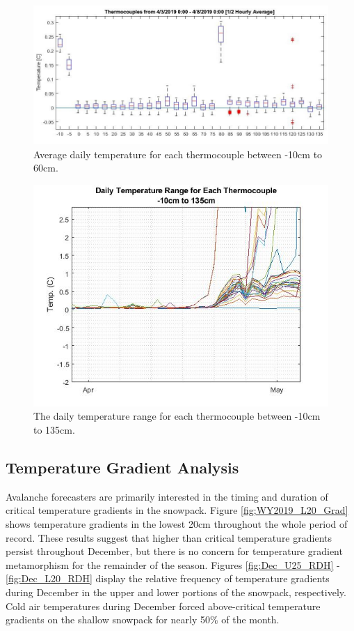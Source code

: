 \begin{figure}[H]
    \raggedleft
    \includegraphics[width=1\linewidth]{figures/Isotherm_boxplot.jpg}
    \caption{Average daily temperature for each thermocouple between -10cm to 60cm.}
    \label{fig:IsothermBoxplot}
 \end{figure}
 
 \begin{figure}[H]
    \centering
    \includegraphics[width=0.8\linewidth]{figures/DailyTempRange_Isotherm.jpg}
    \caption{The daily temperature range for each thermocouple between -10cm to 135cm.}
    \label{fig:DailyTempRange}
 \end{figure}
 
\subsection{Temperature Gradient Analysis}
Avalanche forecasters are primarily interested in the timing and duration of critical temperature gradients in the snowpack. Figure \ref{fig;WY2019_L20_Grad} shows temperature gradients in the lowest 20cm throughout the whole period of record. These results suggest that higher than critical temperature gradients persist throughout December, but there is no concern for temperature gradient metamorphism for the remainder of the season. Figures \ref{fig:Dec_U25_RDH} - \ref{fig:Dec_L20_RDH} display the relative frequency of temperature gradients during December in the upper and lower portions of the snowpack, respectively. Cold air temperatures during December forced above-critical temperature gradients on the shallow snowpack for nearly 50\% of the month. 

